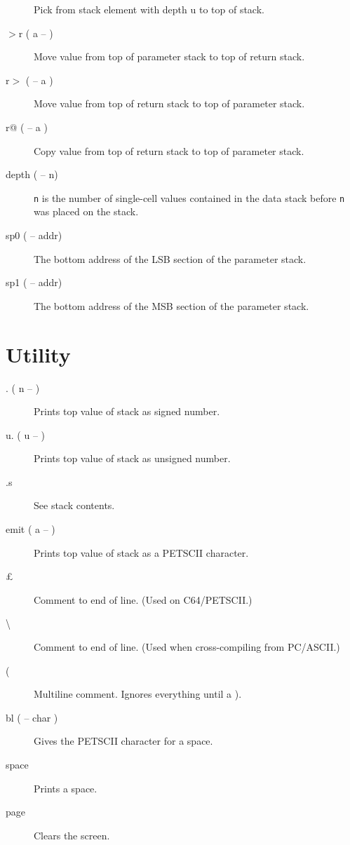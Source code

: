 \begin{description}
Pick from stack element with depth u to top of stack.

\item[$>$r ( a -- )]

Move value from top of parameter stack to top of return stack. 

\item[r$>$ ( -- a )]

Move value from top of return stack to top of parameter stack. 

\item[r@ ( -- a )]

Copy value from top of return stack to top of parameter stack. 

\item[depth ( -- n)] 

\texttt{n} is the number of single-cell values contained in the data stack before \texttt{n} was placed on the stack.

\item[sp0 ( -- addr)] 

The bottom address of the LSB section of the parameter stack.

\item[sp1 ( -- addr)] 

The bottom address of the MSB section of the parameter stack.

\end{description}

\section{Utility}

\begin{description}
\item[. ( n -- )] Prints top value of stack as signed number.
\item[u. ( u -- )] Prints top value of stack as unsigned number.
\item[.s] See stack contents.
\item[emit ( a -- )] Prints top value of stack as a PETSCII character.
\item[\pounds] Comment to end of line. (Used on C64/PETSCII.)
\item[\textbackslash] Comment to end of line. (Used when cross-compiling from PC/ASCII.)
\item[(] Multiline comment. Ignores everything until a ).
\item[bl ( -- char )] Gives the PETSCII character for a space.
\item[space] Prints a space.
\item[page] Clears the screen.
\end{description}

